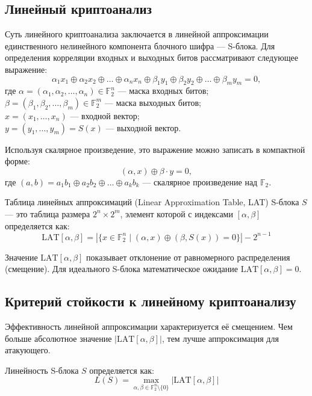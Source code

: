 \subsection{Линейный криптоанализ}

Суть линейного криптоанализа заключается в линейной аппроксимации единственного нелинейного компонента блочного шифра — S-блока. Для определения корреляции входных и выходных битов рассматривают следующее выражение:
\[
    \alpha_1x_1 \oplus \alpha_2x_2 \oplus \dots \oplus \alpha_nx_n \oplus \beta_1y_1 \oplus \beta_2y_2 \oplus \dots \oplus \beta_my_m = 0,
\]
где $\alpha = (\alpha_1, \alpha_2, \dots, \alpha_n) \in \mathbb{F}_2^n$ — маска входных битов; \\
\indent$\beta = (\beta_1, \beta_2, \dots, \beta_m) \in \mathbb{F}_2^m$ — маска выходных битов; \\
\indent$x = (x_1, \dots, x_n)$ — входной вектор; \\
\indent$y = (y_1, \dots, y_m) = S(x)$ — выходной вектор.

Используя скалярное произведение, это выражение можно записать в компактной форме:
\[
    (\alpha, x) \oplus \beta \cdot y = 0,
\]
где $(a,b) = a_1b_1 \oplus a_2b_2 \oplus \dots \oplus a_kb_k$ — скалярное произведение над $\mathbb{F}_2$.

\begin{definition}
Таблица линейных аппроксимаций (Linear Approximation Table, LAT) S-блока $S$ — это таблица размера $2^n \times 2^m$, элемент которой с индексами $[\alpha, \beta]$ определяется как:
\[
    \text{LAT}[\alpha, \beta] = |\{x \in \mathbb{F}_2^n \mid (\alpha, x) \oplus (\beta, S(x)) = 0\}| - 2^{n-1}
\]
\end{definition}

Значение $\text{LAT}[\alpha, \beta]$ показывает отклонение от равномерного распределения (смещение). Для идеального S-блока математическое ожидание $\text{LAT}[\alpha, \beta] = 0$.
\subsection{Критерий стойкости к линейному криптоанализу}

Эффективность линейной аппроксимации характеризуется её смещением. Чем больше абсолютное значение $|\text{LAT}[\alpha, \beta]|$, тем лучше аппроксимация для атакующего.

\begin{definition}
Линейность S-блока $S$ определяется как:
\[
    L(S) = \max_{\alpha, \beta \in \mathbb{F}_2^n \setminus \{0\}} |\text{LAT}[\alpha, \beta]|
\]
\end{definition}

